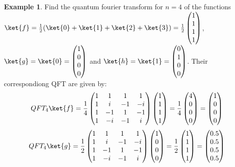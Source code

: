 \documentclass[12pt, oneside]{book}
\theoremstyle{definition}
\theoremstyle{definition}
\newtheorem{example}{Example}[section]
\theoremstyle{remark}
\begin{document}
\begin{example}
    Find the quantum fourier transform for $n=4$ of the functions $\ket{f}=\frac{1}{2}(\ket{0}+\ket{1}+\ket{2}+\ket{3})=\frac{1}{2}\begin{pmatrix} 1 \\ 1 \\ 1 \\ 1 \end{pmatrix}$,
    $\ket{g}=\ket{0}= \begin{pmatrix} 1 \\ 0 \\ 0 \\ 0 \end{pmatrix}$ and $\ket{h}=\ket{1}= \begin{pmatrix} 0 \\ 1 \\ 0 \\ 0 \end{pmatrix}$.
    Their correspondiong QFT are given by:
    \[ QFT_4\ket{f}=\dfrac{1}{4}\begin{pmatrix} 1 & 1 & 1 & 1 \\ 1 & i & -1 & -i \\ 1 & -1 & 1 & -1 \\ 1 & -i & -1 & i \end{pmatrix}\begin{pmatrix} 1 \\ 1 \\ 1 \\ 1 \end{pmatrix}=\dfrac{1}{4}\begin{pmatrix} 4 \\ 0 \\ 0 \\ 0 \end{pmatrix}=\begin{pmatrix} 1 \\ 0 \\ 0 \\ 0 \end{pmatrix} \]
    \[ QFT_4\ket{g}=\dfrac{1}{2}\begin{pmatrix} 1 & 1 & 1 & 1 \\ 1 & i & -1 & -i \\ 1 & -1 & 1 & -1 \\ 1 & -i & -1 & i \end{pmatrix}\begin{pmatrix} 1 \\ 0 \\ 0 \\ 0 \end{pmatrix}=\dfrac{1}{2}\begin{pmatrix} 1 \\ 1 \\ 1 \\ 1 \end{pmatrix}=\begin{pmatrix} 0.5 \\ 0.5 \\ 0.5 \\ 0.5 \end{pmatrix} \]

\end{example}
\end{document}
